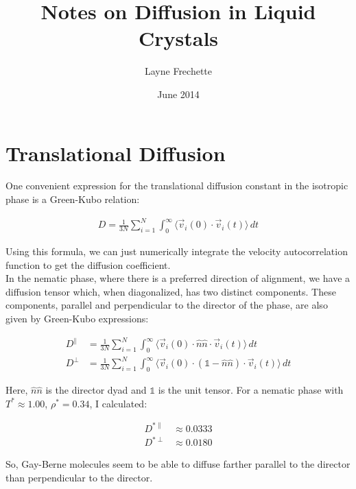 \documentclass[12pt,a4paper]{article}
\begin{document}
\title{Notes on Diffusion in Liquid Crystals}
\author{Layne Frechette}
\date{June 2014}
\maketitle

\section{Translational Diffusion}

One convenient expression for the translational diffusion constant in the isotropic phase is a Green-Kubo relation:

\begin{align*}
D=\frac{1}{3N}\sum_{i=1}^N\int_0^{\infty}\langle \vec{v}_i(0)\cdot \vec{v}_i(t)\rangle \, dt
\end{align*}

\noindent Using this formula, we can just numerically integrate the velocity autocorrelation function to get the diffusion coefficient. \\

\noindent In the nematic phase, where there is a preferred direction of alignment, we have a diffusion tensor which, when diagonalized, has two distinct components. These components, parallel and perpendicular to the director of the phase, are also given by Green-Kubo expressions:

\begin{align*}
D^{\parallel} &= \frac{1}{3N}\sum_{i=1}^N\int_0^{\infty}\langle \vec{v}_i(0)\cdot \hat{n}\hat{n} \cdot \vec{v}_i(t)\rangle \, dt\\
D^{\perp} &= \frac{1}{3N}\sum_{i=1}^N\int_0^{\infty}\langle \vec{v}_i(0)\cdot(\mathds{1}-\hat{n}\hat{n})\cdot \vec{v}_i(t)\rangle \, dt
\end{align*}

\noindent Here, $\hat{n}\hat{n}$ is the director dyad and $\mathds{1}$ is the unit tensor. For a nematic phase with $T^*\approx 1.00$, $\rho^*=0.34$, I calculated:

\begin{align*}
D^{*\parallel}&\approx 0.0333\\
D^{*\perp}&\approx 0.0180
\end{align*}

\noindent So, Gay-Berne molecules seem to be able to diffuse farther parallel to the director than perpendicular to the director.
\end{document}

